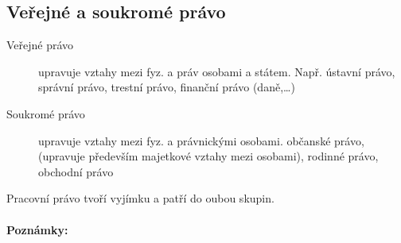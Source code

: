 \documentclass[10pt,a4paper,
twoside,%
]{report}
\begin{document}
\subsection{Veřejné a soukromé právo}
\begin{description}
\item[Veřejné právo] upravuje vztahy mezi fyz. a práv osobami a státem. Např. \textsf{ústavní právo, správní právo, trestní právo, finanční právo} (daně,\dots)
\item[Soukromé právo] upravuje vztahy mezi fyz. a právnickými osobami.
\textsf{občanské právo},(upravuje především majetkové vztahy mezi osobami), \textsf{rodinné právo, obchodní právo}
\end{description}
\textsf{Pracovní právo} tvoří vyjímku a patří do oubou skupin.

\paragraph{Poznámky:}

\dotfill{} \vspace{0.2cm}

\dotfill{} \vspace{0.2cm}

\dotfill{} \vspace{0.2cm}

\dotfill{} \vspace{0.2cm}

\dotfill{} \vspace{0.2cm}

\dotfill{} \vspace{0.2cm}

\dotfill{} \vspace{0.2cm}

\dotfill{} \vspace{0.2cm}

\dotfill{} \vspace{0.2cm}

\dotfill{} \vspace{0.2cm}

\dotfill{} \vspace{0.2cm}

\dotfill{} \vspace{0.2cm}

\dotfill{} \vspace{0.2cm}

\dotfill{} \vspace{0.2cm}

\dotfill{} \vspace{0.2cm}
\end{document}
